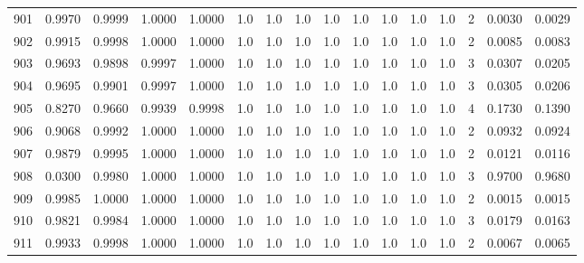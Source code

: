 \begin{tabular}{lrrrrrrrrrrrrrrr}
901 &      0.9970 &  0.9999 &  1.0000 &  1.0000 &     1.0 &     1.0 &     1.0 &     1.0 &     1.0 &     1.0 &      1.0 &        1.0 &      2 &                    0.0030 &                     0.0029 \\
902 &      0.9915 &  0.9998 &  1.0000 &  1.0000 &     1.0 &     1.0 &     1.0 &     1.0 &     1.0 &     1.0 &      1.0 &        1.0 &      2 &                    0.0085 &                     0.0083 \\
903 &      0.9693 &  0.9898 &  0.9997 &  1.0000 &     1.0 &     1.0 &     1.0 &     1.0 &     1.0 &     1.0 &      1.0 &        1.0 &      3 &                    0.0307 &                     0.0205 \\
904 &      0.9695 &  0.9901 &  0.9997 &  1.0000 &     1.0 &     1.0 &     1.0 &     1.0 &     1.0 &     1.0 &      1.0 &        1.0 &      3 &                    0.0305 &                     0.0206 \\
905 &      0.8270 &  0.9660 &  0.9939 &  0.9998 &     1.0 &     1.0 &     1.0 &     1.0 &     1.0 &     1.0 &      1.0 &        1.0 &      4 &                    0.1730 &                     0.1390 \\
906 &      0.9068 &  0.9992 &  1.0000 &  1.0000 &     1.0 &     1.0 &     1.0 &     1.0 &     1.0 &     1.0 &      1.0 &        1.0 &      2 &                    0.0932 &                     0.0924 \\
907 &      0.9879 &  0.9995 &  1.0000 &  1.0000 &     1.0 &     1.0 &     1.0 &     1.0 &     1.0 &     1.0 &      1.0 &        1.0 &      2 &                    0.0121 &                     0.0116 \\
908 &      0.0300 &  0.9980 &  1.0000 &  1.0000 &     1.0 &     1.0 &     1.0 &     1.0 &     1.0 &     1.0 &      1.0 &        1.0 &      3 &                    0.9700 &                     0.9680 \\
909 &      0.9985 &  1.0000 &  1.0000 &  1.0000 &     1.0 &     1.0 &     1.0 &     1.0 &     1.0 &     1.0 &      1.0 &        1.0 &      2 &                    0.0015 &                     0.0015 \\
910 &      0.9821 &  0.9984 &  1.0000 &  1.0000 &     1.0 &     1.0 &     1.0 &     1.0 &     1.0 &     1.0 &      1.0 &        1.0 &      3 &                    0.0179 &                     0.0163 \\
911 &      0.9933 &  0.9998 &  1.0000 &  1.0000 &     1.0 &     1.0 &     1.0 &     1.0 &     1.0 &     1.0 &      1.0 &        1.0 &      2 &                    0.0067 &                     0.0065 \\

\end{tabular}
